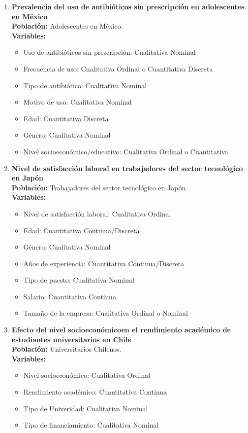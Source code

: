 \documentclass[12pt, letterpaper]{article}
\begin{document}
\begin{enumerate}
\item \textbf{Prevalencia del uso de antibióticos sin prescripción en adolescentes en México} \\ 
\textbf{Población:} Adolescentes en México. \\ 
\textbf{Variables:}
\begin{itemize}
  \item Uso de antibióticos sin prescripción: Cualitativa Nominal
  \item Frecuencia de uso: Cualitativa Ordinal o Cuantitativa Discreta
  \item Tipo de antibiótico: Cualitativa Nominal
  \item Motivo de uso: Cualitativa Nominal
  \item Edad: Cuantitativa Discreta
  \item Género: Cualitativa Nominal
  \item Nivel socioeconómico/educativo: Cualitativa Ordinal o Cuantitativa
\end{itemize}

\item \textbf{Nivel de satisfacción laboral en trabajadores del sector tecnológico en Japón} \\ 
\textbf{Población:} Trabajadores del sector tecnológico en Japón. \\ 
\textbf{Variables:}
\begin{itemize}
  \item Nivel de satisfacción laboral: Cualitativa Ordinal
  \item Edad: Cuantitativa Continua/Discreta
  \item Género: Cualitativa Nominal
  \item Años de experiencia: Cuantitativa Continua/Discreta
  \item Tipo de puesto: Cualitativa Nominal
  \item Salario: Cuantitativa Continua
  \item Tamaño de la empresa: Cualitativa Ordinal o Nominal
\end{itemize}

\item \textbf{Efecto del nivel socioeconómicoen el rendimiento académico de estudiantes universitarios en Chile} \\ 
\textbf{Población:} Universitarios Chilenos. \\ 
\textbf{Variables:}
\begin{itemize}
  \item Nivel socioeconómico: Cualitativa Ordinal
  \item Rendimiento académico: Cuantitativa Continua
  \item Tipo de Univeridad: Cualitativa Nominal
  \item Tipo de financiamiento: Cualitativa Nominal
\end{itemize}



\end{enumerate}
\end{document}
